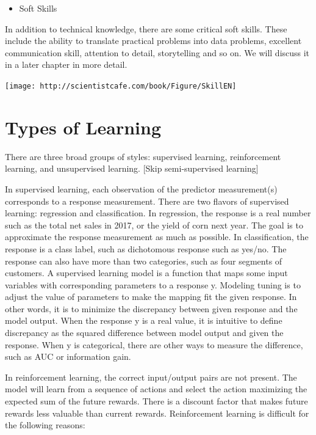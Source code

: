 \documentclass[]{book}
\providecommand{\tightlist}{%
  \setlength{\itemsep}{0pt}\setlength{\parskip}{0pt}}
\theoremstyle{definition}
\theoremstyle{definition}
\theoremstyle{remark}
\begin{document}
\begin{itemize}
\tightlist
\item
  Soft Skills
\end{itemize}

In addition to technical knowledge, there are some critical soft skills.
These include the ability to translate practical problems into data
problems, excellent communication skill, attention to detail,
storytelling and so on. We will discuss it in a later chapter in more
detail.

\texttt{[image: http://scientistcafe.com/book/Figure/SkillEN]}

\section{Types of Learning}\label{types-of-learning}

There are three broad groups of styles: supervised learning,
reinforcement learning, and unsupervised learning. {[}Skip
semi-supervised learning{]}

In supervised learning, each observation of the predictor measurement(s)
corresponds to a response measurement. There are two flavors of
supervised learning: regression and classification. In regression, the
response is a real number such as the total net sales in 2017, or the
yield of corn next year. The goal is to approximate the response
measurement as much as possible. In classification, the response is a
class label, such as dichotomous response such as yes/no. The response
can also have more than two categories, such as four segments of
customers. A supervised learning model is a function that maps some
input variables with corresponding parameters to a response y. Modeling
tuning is to adjust the value of parameters to make the mapping fit the
given response. In other words, it is to minimize the discrepancy
between given response and the model output. When the response y is a
real value, it is intuitive to define discrepancy as the squared
difference between model output and given the response. When y is
categorical, there are other ways to measure the difference, such as AUC
or information gain.

In reinforcement learning, the correct input/output pairs are not
present. The model will learn from a sequence of actions and select the
action maximizing the expected sum of the future rewards. There is a
discount factor that makes future rewards less valuable than current
rewards. Reinforcement learning is difficult for the following reasons:
\end{document}
